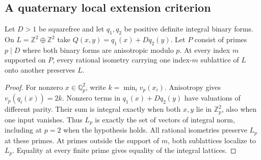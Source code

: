 \subsection{A quaternary local extension criterion}
\begin{lemma}\label{lem:quat-integral-norm}
Let $D>1$ be squarefree and let $q_1,q_2$ be positive definite integral binary forms. On $L=\mathbb Z^2\oplus\mathbb Z^2$ take $Q(x,y)=q_1(x)+Dq_2(y)$. Let $P$ consist of primes $p\mid D$ where both binary forms are anisotropic modulo $p$. At every index $m$ supported on $P$, every rational isometry carrying one index-$m$ sublattice of $L$ onto another preserves $L$.
\end{lemma}
\begin{proof}
For nonzero $x\in\mathbb Q_p^2$, write $k=\min_i v_p(x_i)$. Anisotropy gives $v_p(q_i(x))=2k$. Nonzero terms in $q_1(x)+Dq_2(y)$ have valuations of different parity. Their sum is integral exactly when both $x,y$ lie in $\mathbb Z_p^2$, also when one input vanishes. Thus $L_p$ is exactly the set of vectors of integral norm, including at $p=2$ when the hypothesis holds. All rational isometries preserve $L_p$ at these primes. At primes outside the support of $m$, both sublattices localize to $L_p$. Equality at every finite prime gives equality of the integral lattices.
\end{proof}

